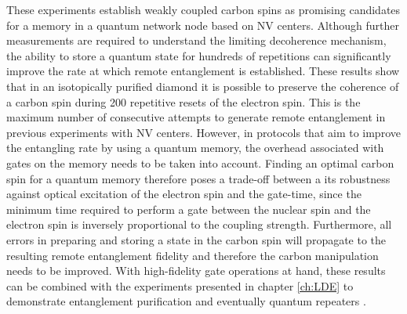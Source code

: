 These experiments establish weakly coupled carbon spins as promising candidates for a memory in a quantum network node based on NV centers. Although further measurements are required to understand the limiting decoherence mechanism, the ability to store a quantum state for hundreds of repetitions can significantly improve the rate at which remote entanglement is established. These results show that in an isotopically purified diamond it is possible to preserve the coherence of a carbon spin during 200 repetitive resets of the electron spin. This is the maximum number of consecutive attempts to generate remote entanglement in previous experiments with NV centers\cite{Bernien_Nature_2013,Pfaff_Science_2014}. However, in protocols that aim to improve the entangling rate by using a quantum memory, the overhead associated with gates on the memory needs to be taken into account. Finding an optimal carbon spin for a quantum memory therefore poses a trade-off between a its robustness against optical excitation of the electron spin and the gate-time, since the minimum time required to perform a gate between the nuclear spin and the electron spin is inversely proportional to the coupling strength. Furthermore, all errors in preparing and storing a state in the carbon spin will propagate to the resulting remote entanglement fidelity and therefore the carbon manipulation needs to be improved. With high-fidelity gate operations at hand, these results can be combined with the experiments presented in chapter \ref{ch:LDE} to demonstrate entanglement purification\cite{Campbell_Phys.Rev.Lett._2008} and eventually quantum repeaters \cite{Briegel_Phys.Rev.Lett._1998}.

\clearpage




